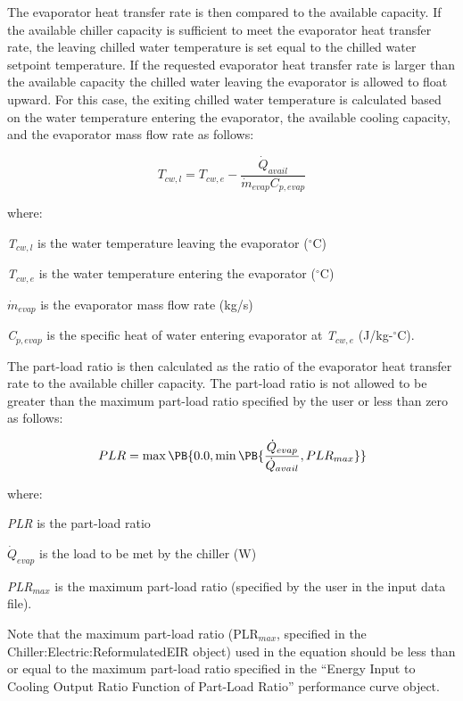 The evaporator heat transfer rate is then compared to the available capacity. If the available chiller capacity is sufficient to meet the evaporator heat transfer rate, the leaving chilled water temperature is set equal to the chilled water setpoint temperature. If the requested evaporator heat transfer rate is larger than the available capacity the chilled water leaving the evaporator is allowed to float upward. For this case, the exiting chilled water temperature is calculated based on the water temperature entering the evaporator, the available cooling capacity, and the evaporator mass flow rate as follows:

\begin{equation}
  T_{cw,l}  =  T_{cw,e} - \frac{\dot{Q}_{avail}}{\dot{m}_{evap}C_{p,evap}}
\end{equation}

where:

\emph{T\(_{cw,l}\)} is the water temperature leaving the evaporator (\(^{\circ}\)C)

\emph{T\(_{cw,e}\)} is the water temperature entering the evaporator (\(^{\circ}\)C)

\({\dot{m}_{evap}}\) is the evaporator mass flow rate (kg/s)

\emph{C\(_{p,evap}\)} is the specific heat of water entering evaporator at \emph{T\(_{cw,e}\)} (J/kg-\(^{\circ}\)C).

The part-load ratio is then calculated as the ratio of the evaporator heat transfer rate to the available chiller capacity. The part-load ratio is not allowed to be greater than the maximum part-load ratio specified by the user or less than zero as follows:

\begin{equation}
  PLR = \max\PB{0.0,\min\PB{\frac{\dot{Q}_{evap}}{\dot{Q}_{avail}},PLR_{max}}}
\end{equation}

where:

\emph{PLR} is the part-load ratio

\({\dot{Q}_{evap}}\) is the load to be met by the chiller (W)

\emph{PLR\(_{max}\)} is the maximum part-load ratio (specified by the user in the input data file).

Note that the maximum part-load ratio (PLR\(_{max}\), specified in the Chiller:Electric:ReformulatedEIR object) used in the equation should be less than or equal to the maximum part-load ratio specified in the ``Energy Input to Cooling Output Ratio Function of Part-Load Ratio'' performance curve object.

